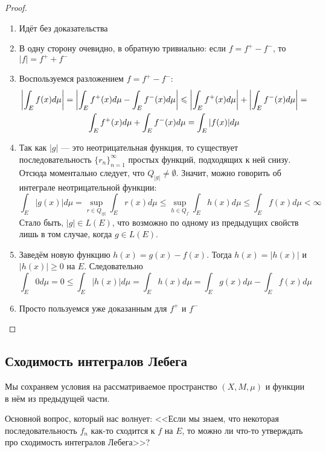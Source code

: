 \begin{proof}~
	\begin{enumerate}
		\item Идёт без доказательства
		
		\item В одну сторону очевидно, в обратную тривиально: если $f = f^+ - f^-$, то $|f| = f^+ + f^-$
		
		\item Воспользуемся разложением $f = f^+ - f^-$:
		\begin{multline*}
			\left|\int_E f(x)d\mu\right| = \left|\int_E f^+(x)d\mu - \int_E f^-(x)d\mu\right| \leqslant \left|\int_E f^+(x)d\mu\right| + \left|\int_E f^-(x)d\mu\right| =
			\\
			\int_E f^+(x)d\mu + \int_E f^-(x)d\mu = \int_E |f(x)|d\mu
		\end{multline*}
		
		\item Так как $|g|$ --- это неотрицательная функция, то существует последовательность $\{r_n\}_{n = 1}^\infty$ простых функций, подходящих к ней снизу. Отсюда моментально следует, что $Q_{|g|} \neq \emptyset$. Значит, можно говорить об интеграле неотрицательной функции:
		\[
			\int_E |g(x)|d\mu = \sup_{r \in Q_{|g|}} \int_E r(x)d\mu \le \sup_{h \in Q_f} \int_E h(x)d\mu \le \int_E f(x)d\mu < \infty
		\]
		Стало быть, $|g| \in L(E)$, что возможно по одному из предыдущих свойств лишь в том случае, когда $g \in L(E)$.
		
		\item Заведём новую функцию $h(x) = g(x) - f(x)$. Тогда $h(x) = |h(x)|$ и $|h(x)| \ge 0$ на $E$. Следовательно
		\[
			\int_E 0d\mu = 0 \le \int_E |h(x)|d\mu = \int_E h(x)d\mu = \int_E g(x)d\mu - \int_E f(x)d\mu
		\]
		
		\item Просто пользуемся уже доказанным для $f^+$ и $f^-$
	\end{enumerate}
\end{proof}

\subsection{Сходимость интегралов Лебега}

\begin{note}
	Мы сохраняем условия на рассматриваемое пространство $(X, M, \mu)$ и функции в нём из предыдущей части.
\end{note}

\begin{note}
	Основной вопрос, который нас волнует: <<Если мы знаем, что некоторая последовательность $f_n$ как-то сходится к $f$ на $E$, то можно ли что-то утверждать про сходимость интегралов Лебега>>?
\end{note}


